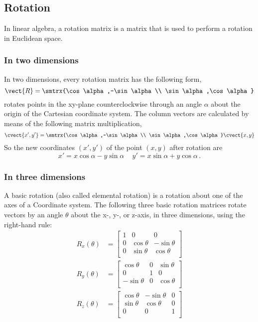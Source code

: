 \subsection{Rotation}
In linear algebra, a rotation matrix is a matrix that is used to perform a rotation in Euclidean space.
\subsubsection{In two dimensions}
In two dimensions, every rotation matrix has the following form,
\[ \vect{R}=\smtrx{\cos\alpha,-\sin\alpha\\ \sin\alpha,\cos\alpha} \]
rotates points in the xy-plane counterclockwise through an angle $\alpha$ about the origin of the Cartesian coordinate system. The column vectors are calculated by means of the following matrix multiplication,
\begin{equation*}
\cvect{x',y'}=\smtrx{\cos\alpha,-\sin\alpha\\ \sin\alpha,\cos\alpha}\cvect{x,y}
\end{equation*}
So the new coordinates $\left( x',y' \right)$ of the point $\left( x,y \right)$ after rotation are
\[
 x'=x\cos \alpha -y\sin \alpha \, \quad
 y'=x\sin \alpha +y\cos \alpha \,.
\]
\subsubsection{In three dimensions}
A basic rotation (also called elemental rotation) is a rotation about one of the axes of a Coordinate system. The following three basic rotation matrices rotate vectors by an angle $\theta$ about the x-, y-, or z-axis, in three dimensions, using the right-hand rule:
\[ {\begin{alignedat}{1}R_{x}(\theta )&={\begin{bmatrix}1&0&0\\0&\cos \theta &-\sin \theta \\[3pt]0&\sin \theta &\cos \theta \\[3pt]\end{bmatrix}}\\[6pt]R_{y}(\theta )&={\begin{bmatrix}\cos \theta &0&\sin \theta \\[3pt]0&1&0\\[3pt]-\sin \theta &0&\cos \theta \\\end{bmatrix}}\\[6pt]R_{z}(\theta )&={\begin{bmatrix}\cos \theta &-\sin \theta &0\\[3pt]\sin \theta &\cos \theta &0\\[3pt]0&0&1\\\end{bmatrix}}\end{alignedat}}\]


